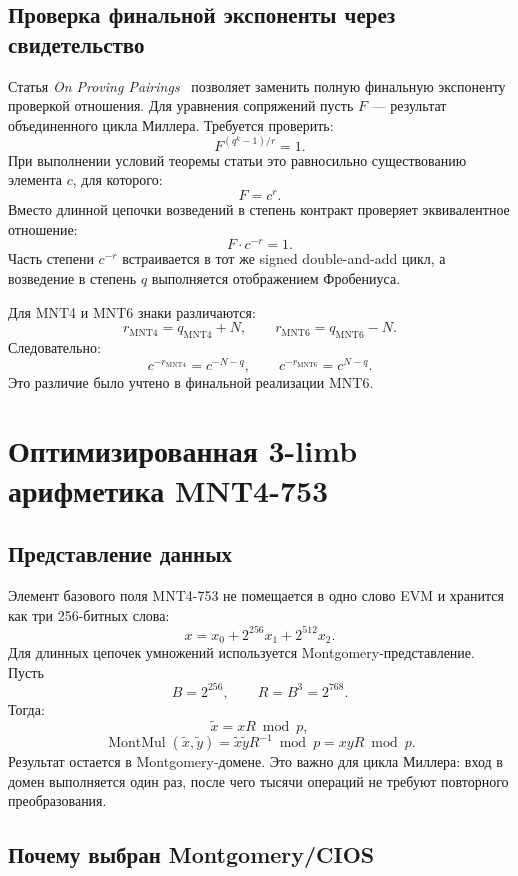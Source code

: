 \documentclass[12pt,a4paper]{article}
\begin{document}
\subsection{Проверка финальной экспоненты через свидетельство}

Статья \emph{On Proving Pairings}~\cite{eprint640} позволяет заменить полную
финальную экспоненту проверкой отношения. Для уравнения сопряжений пусть $F$ ---
результат объединенного цикла Миллера. Требуется проверить:
\[
    F^{(q^k-1)/r}=1.
\]
При выполнении условий теоремы статьи это равносильно существованию элемента
$c$, для которого:
\[
    F=c^r.
\]
Вместо длинной цепочки возведений в степень контракт проверяет эквивалентное
отношение:
\[
    F\cdot c^{-r}=1.
\]
Часть степени $c^{-r}$ встраивается в тот же signed double-and-add цикл, а
возведение в степень $q$ выполняется отображением Фробениуса.

Для MNT4 и MNT6 знаки различаются:
\[
    r_{\mathrm{MNT4}}=q_{\mathrm{MNT4}}+N,
    \qquad
    r_{\mathrm{MNT6}}=q_{\mathrm{MNT6}}-N.
\]
Следовательно:
\[
    c^{-r_{\mathrm{MNT4}}}=c^{-N-q},
    \qquad
    c^{-r_{\mathrm{MNT6}}}=c^{N-q}.
\]
Это различие было учтено в финальной реализации MNT6.

\section{Оптимизированная 3-limb арифметика MNT4-753}

\subsection{Представление данных}

Элемент базового поля MNT4-753 не помещается в одно слово EVM и хранится как
три 256-битных слова:
\[
    x=x_0+2^{256}x_1+2^{512}x_2.
\]
Для длинных цепочек умножений используется Montgomery-представление. Пусть
\[
    B=2^{256},\qquad R=B^3=2^{768}.
\]
Тогда:
\[
    \widetilde{x}=xR\bmod p,
\]
\[
    \operatorname{MontMul}(\widetilde{x},\widetilde{y})
    =\widetilde{x}\widetilde{y}R^{-1}\bmod p
    =xyR\bmod p.
\]
Результат остается в Montgomery-домене. Это важно для цикла Миллера: вход в
домен выполняется один раз, после чего тысячи операций не требуют повторного
преобразования.

\subsection{Почему выбран Montgomery/CIOS}
\end{document}
